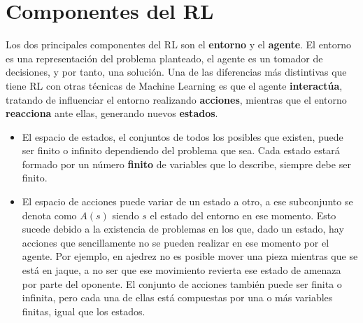 \documentclass[11pt,fleqn]{book} %
\begin{document}

\section{Componentes del RL}\label{sec:componentesRL}

Los dos principales componentes del RL son el \textbf{entorno} y el \textbf{agente}. El entorno es una representación del problema planteado, el agente es un tomador de decisiones, y por tanto, una solución. Una de las diferencias más distintivas que tiene RL con otras técnicas de Machine Learning es que el agente \textbf{interactúa}, tratando de influenciar el entorno realizando \textbf{acciones}, mientras que el entorno \textbf{reacciona} ante ellas, generando nuevos \textbf{estados}. \\

\begin{itemize}
	\item El espacio de estados, el conjuntos de todos los posibles que existen, puede ser finito o infinito dependiendo del problema que sea. Cada estado estará formado por un número \textbf{finito} de variables que lo describe, siempre debe ser finito. \\
	
	\item El espacio de acciones puede variar de un estado a otro, a ese subconjunto se denota como $A(s)$ siendo $s$ el estado del entorno en ese momento. Esto sucede debido a la existencia de problemas en los que, dado un estado, hay acciones que sencillamente no se pueden realizar en ese momento por el agente. Por ejemplo, en ajedrez no es posible mover una pieza mientras que se está en jaque, a no ser que ese movimiento revierta ese estado de amenaza por parte del oponente. El conjunto de acciones también puede ser finita o infinita, pero cada una de ellas está compuestas por una o más variables finitas, igual que los estados.
\end{itemize}
\end{document}
